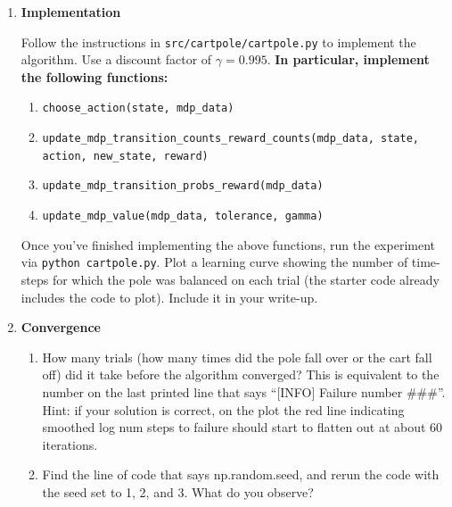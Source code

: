 \begin{enumerate}
  \item {} 
  \textbf{Implementation}

  Follow the instructions in {\tt src/cartpole/cartpole.py} to implement the algorithm. Use a discount factor
  of $\gamma = 0.995$.  \textbf{In particular, implement the following functions:}

\begin{enumerate}
    \item \texttt{choose\_action(state, mdp\_data)}
    \item \texttt{update\_mdp\_transition\_counts\_reward\_counts(mdp\_data, state, action, new\_state, reward)}
    \item \texttt{update\_mdp\_transition\_probs\_reward(mdp\_data)}
    \item \texttt{update\_mdp\_value(mdp\_data, tolerance, gamma)}
\end{enumerate}

Once you've finished implementing the above functions, run the experiment via {\tt python cartpole.py}. 
Plot a learning curve showing the number of time-steps for which the pole was balanced on each trial (the 
starter code already includes the code to plot). Include it in your write-up.

  \item {}
  \textbf{Convergence}
    \begin{enumerate}
      \item How many trials (how many times did the pole fall over or the cart fall off) 
            did it take before the algorithm converged? This is equivalent to the number
            on the last printed line that says ``[INFO] Failure number \#\#\#''.
            Hint: if your solution is correct, on the plot the red line indicating smoothed log num steps 
            to failure should start to flatten out at about 60 iterations.
      \item Find the line of code that says np.random.seed, and rerun the code with the seed set to 1, 2, and 3. 
            What do you observe?
    \end{enumerate}

\end{enumerate}


